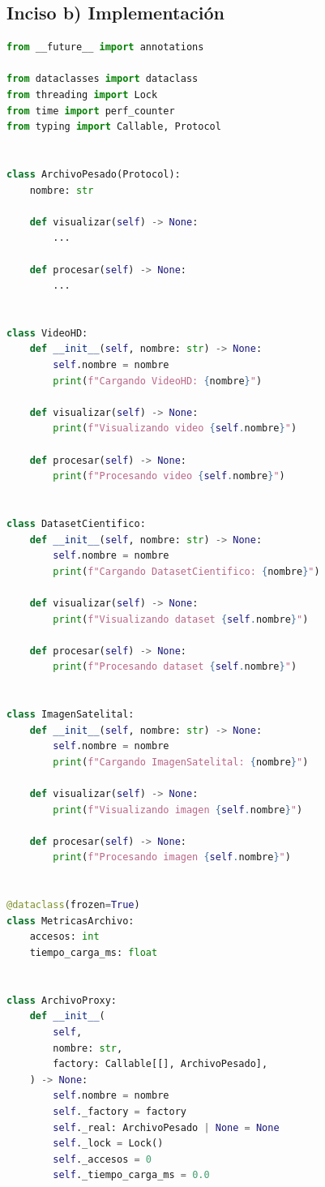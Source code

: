 \subsection{Inciso b) Implementación}

\begin{lstlisting}[language=Python,caption={Interfaz, archivos reales y Virtual Proxy con métricas}]
from __future__ import annotations

from dataclasses import dataclass
from threading import Lock
from time import perf_counter
from typing import Callable, Protocol


class ArchivoPesado(Protocol):
    nombre: str

    def visualizar(self) -> None:
        ...

    def procesar(self) -> None:
        ...


class VideoHD:
    def __init__(self, nombre: str) -> None:
        self.nombre = nombre
        print(f"Cargando VideoHD: {nombre}")

    def visualizar(self) -> None:
        print(f"Visualizando video {self.nombre}")

    def procesar(self) -> None:
        print(f"Procesando video {self.nombre}")


class DatasetCientifico:
    def __init__(self, nombre: str) -> None:
        self.nombre = nombre
        print(f"Cargando DatasetCientifico: {nombre}")

    def visualizar(self) -> None:
        print(f"Visualizando dataset {self.nombre}")

    def procesar(self) -> None:
        print(f"Procesando dataset {self.nombre}")


class ImagenSatelital:
    def __init__(self, nombre: str) -> None:
        self.nombre = nombre
        print(f"Cargando ImagenSatelital: {nombre}")

    def visualizar(self) -> None:
        print(f"Visualizando imagen {self.nombre}")

    def procesar(self) -> None:
        print(f"Procesando imagen {self.nombre}")


@dataclass(frozen=True)
class MetricasArchivo:
    accesos: int
    tiempo_carga_ms: float


class ArchivoProxy:
    def __init__(
        self,
        nombre: str,
        factory: Callable[[], ArchivoPesado],
    ) -> None:
        self.nombre = nombre
        self._factory = factory
        self._real: ArchivoPesado | None = None
        self._lock = Lock()
        self._accesos = 0
        self._tiempo_carga_ms = 0.0


\end{lstlisting}
